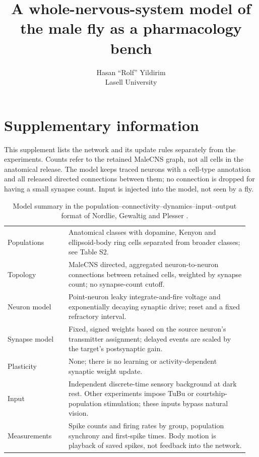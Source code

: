 \documentclass[11pt]{article}
\title{A whole-nervous-system model of the male fly as a pharmacology bench}
\author{Hasan ``Rolf'' Yildirim\\Lasell University}
\date{}\hypersetup{pdftitle={A whole-nervous-system model of the male fly as a pharmacology bench},pdfauthor={Hasan "Rolf" Yildirim}}
\begin{document}
\maketitle
\section*{Supplementary information}

This supplement lists the network and its update rules separately from the experiments. Counts refer to the retained MaleCNS graph, not all cells in the anatomical release. The model keeps traced neurons with a cell-type annotation and all released directed connections between them; no connection is dropped for having a small synapse count. Input is injected into the model, not seen by a fly.

\begin{table}[htbp]
\caption{Model summary in the population--connectivity--dynamics--input--output format of Nordlie, Gewaltig and Plesser \cite{nordlie}.}
\small\begin{tabular}{@{}p{0.24\linewidth}p{0.71\linewidth}@{}}\toprule
Populations & Anatomical classes with dopamine, Kenyon and ellipsoid-body ring cells separated from broader classes; see Table S2. \\
Topology & MaleCNS directed, aggregated neuron-to-neuron connections between retained cells, weighted by synapse count; no synapse-count cutoff. \\
Neuron model & Point-neuron leaky integrate-and-fire voltage and exponentially decaying synaptic drive; reset and a fixed refractory interval. \\
Synapse model & Fixed, signed weights based on the source neuron's transmitter assignment; delayed events are scaled by the target's postsynaptic gain. \\
Plasticity & None; there is no learning or activity-dependent synaptic weight update. \\
Input & Independent discrete-time sensory background at dark rest. Other experiments impose TuBu or courtship-population stimulation; these inputs bypass natural vision. \\
Measurements & Spike counts and firing rates by group, population synchrony and first-spike times. Body motion is playback of saved spikes, not feedback into the network. \\
\bottomrule\end{tabular}
\end{table}
\end{document}
